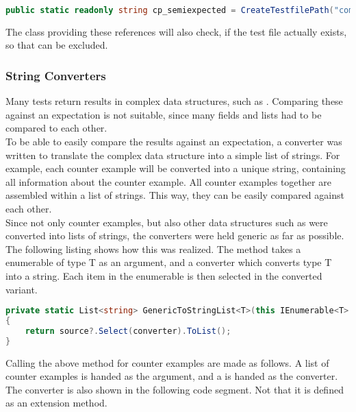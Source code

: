 \begin{lstlisting}[language=csharp, caption={Test File Reference}, captionpos=b, label={lst:semiExpectedCodeThing}]
public static readonly string cp_semiexpected = CreateTestfilePath("compile/semi_expected_error.dfy");
\end{lstlisting}
The class providing these references will also check, if the test file actually exists, so that  can be excluded.

\subsubsection{String Converters}
Many tests return results in complex data structures, such as . Comparing these against an expectation is not suitable, since many fields and lists had to be compared to each other.\\
To be able to easily compare the results against an expectation, a converter was written to translate the complex data structure into a simple list of strings. For example, each counter example will be converted into a unique string, containing all information about the counter example. All counter examples together are assembled within a list of strings. This way, they can be easily compared against each other.\\
Since not only counter examples, but also other data structures such as  were converted into lists of strings, the converters were held generic as far as possible. The following listing shows how this was realized. The method takes a enumerable of type T as an argument, and a converter which converts type T into a string. Each item in the enumerable is then selected in the converted variant.

\begin{lstlisting}[language=csharp, caption={Generic Method to Convert an IEnumerable}, captionpos=b, label={lst:genericconverter}]
private static List<string> GenericToStringList<T>(this IEnumerable<T> source, Func<T, string> converter)
{
    return source?.Select(converter).ToList();
}
\end{lstlisting}

Calling the above method for counter examples are made as follows. A list of counter examples is handed as the argument, and a  is handed as the converter. The converter is also shown in the following code segment. Not that it is defined as an extension method.

